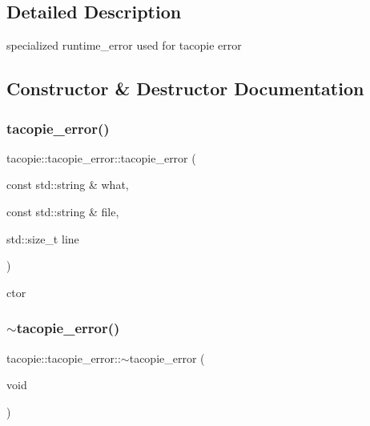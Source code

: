 \subsection{Detailed Description}
specialized runtime\+\_\+error used for tacopie error 

\subsection{Constructor \& Destructor Documentation}
\mbox{\label{classtacopie_1_1tacopie__error_a524fb8e9ac1825a57664421a3f32b9ce}} 
\subsubsection{\texorpdfstring{tacopie\+\_\+error()}{tacopie\_error()}\hspace{0.1cm}{\footnotesize\ttfamily [1/2]}}
{\footnotesize\ttfamily tacopie\+::tacopie\+\_\+error\+::tacopie\+\_\+error (\begin{DoxyParamCaption}\item[{const std\+::string \&}]{what,  }\item[{const std\+::string \&}]{file,  }\item[{std\+::size\+\_\+t}]{line }\end{DoxyParamCaption})}



ctor 

\mbox{\label{classtacopie_1_1tacopie__error_a5bf6b0967f7f4cf2b8f8d0a2ef0912b2}} 
\subsubsection{\texorpdfstring{$\sim$tacopie\+\_\+error()}{~tacopie\_error()}}
{\footnotesize\ttfamily tacopie\+::tacopie\+\_\+error\+::$\sim$tacopie\+\_\+error (\begin{DoxyParamCaption}\item[{void}]{ }\end{DoxyParamCaption})\hspace{0.3cm}{\ttfamily [default]}}



